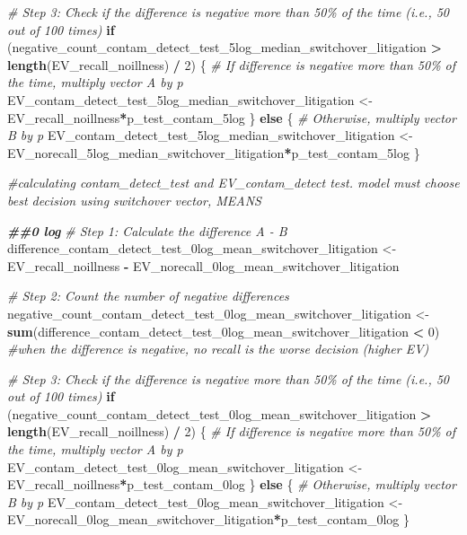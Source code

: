 \documentclass[
]{article}
\newenvironment{Shaded}{\begin{snugshade}}{\end{snugshade}}
\newcommand{\CommentTok}[1]{\textcolor[rgb]{0.56,0.35,0.01}{\textit{#1}}}
\newcommand{\ControlFlowTok}[1]{\textcolor[rgb]{0.13,0.29,0.53}{\textbf{#1}}}
\newcommand{\DecValTok}[1]{\textcolor[rgb]{0.00,0.00,0.81}{#1}}
\newcommand{\DocumentationTok}[1]{\textcolor[rgb]{0.56,0.35,0.01}{\textbf{\textit{#1}}}}
\newcommand{\FunctionTok}[1]{\textcolor[rgb]{0.13,0.29,0.53}{\textbf{#1}}}
\newcommand{\NormalTok}[1]{#1}
\newcommand{\OtherTok}[1]{\textcolor[rgb]{0.56,0.35,0.01}{#1}}
\newcommand{\SpecialCharTok}[1]{\textcolor[rgb]{0.81,0.36,0.00}{\textbf{#1}}}
\begin{document}
\begin{Shaded}
\begin{Highlighting}[]
\CommentTok{\# Step 3: Check if the difference is negative more than 50\% of the time (i.e., 50 out of 100 times)}
\ControlFlowTok{if}\NormalTok{ (negative\_count\_contam\_detect\_test\_5log\_median\_switchover\_litigation }\SpecialCharTok{\textgreater{}} \FunctionTok{length}\NormalTok{(EV\_recall\_noillness) }\SpecialCharTok{/} \DecValTok{2}\NormalTok{) \{}
  \CommentTok{\# If difference is negative more than 50\% of the time, multiply vector A by p}
\NormalTok{  EV\_contam\_detect\_test\_5log\_median\_switchover\_litigation }\OtherTok{\textless{}{-}}\NormalTok{ EV\_recall\_noillness}\SpecialCharTok{*}\NormalTok{p\_test\_contam\_5log}
\NormalTok{\} }\ControlFlowTok{else}\NormalTok{ \{}
  \CommentTok{\# Otherwise, multiply vector B by p}
\NormalTok{ EV\_contam\_detect\_test\_5log\_median\_switchover\_litigation  }\OtherTok{\textless{}{-}}\NormalTok{ EV\_norecall\_5log\_median\_switchover\_litigation}\SpecialCharTok{*}\NormalTok{p\_test\_contam\_5log}
\NormalTok{\}}


\CommentTok{\#calculating contam\_detect\_test and EV\_contam\_detect test. model must choose best decision using switchover vector, MEANS}

\DocumentationTok{\#\#0 log}
\CommentTok{\# Step 1: Calculate the difference A {-} B}
\NormalTok{difference\_contam\_detect\_test\_0log\_mean\_switchover\_litigation }\OtherTok{\textless{}{-}}\NormalTok{ EV\_recall\_noillness }\SpecialCharTok{{-}}\NormalTok{ EV\_norecall\_0log\_mean\_switchover\_litigation}

\CommentTok{\# Step 2: Count the number of negative differences}
\NormalTok{negative\_count\_contam\_detect\_test\_0log\_mean\_switchover\_litigation }\OtherTok{\textless{}{-}} \FunctionTok{sum}\NormalTok{(difference\_contam\_detect\_test\_0log\_mean\_switchover\_litigation }\SpecialCharTok{\textless{}} \DecValTok{0}\NormalTok{) }\CommentTok{\#when the difference is negative, no recall is the worse decision (higher EV)}

\CommentTok{\# Step 3: Check if the difference is negative more than 50\% of the time (i.e., 50 out of 100 times)}
\ControlFlowTok{if}\NormalTok{ (negative\_count\_contam\_detect\_test\_0log\_mean\_switchover\_litigation }\SpecialCharTok{\textgreater{}} \FunctionTok{length}\NormalTok{(EV\_recall\_noillness) }\SpecialCharTok{/} \DecValTok{2}\NormalTok{) \{}
  \CommentTok{\# If difference is negative more than 50\% of the time, multiply vector A by p}
\NormalTok{  EV\_contam\_detect\_test\_0log\_mean\_switchover\_litigation }\OtherTok{\textless{}{-}}\NormalTok{ EV\_recall\_noillness}\SpecialCharTok{*}\NormalTok{p\_test\_contam\_0log}
\NormalTok{\} }\ControlFlowTok{else}\NormalTok{ \{}
  \CommentTok{\# Otherwise, multiply vector B by p}
\NormalTok{ EV\_contam\_detect\_test\_0log\_mean\_switchover\_litigation }\OtherTok{\textless{}{-}}\NormalTok{ EV\_norecall\_0log\_mean\_switchover\_litigation}\SpecialCharTok{*}\NormalTok{p\_test\_contam\_0log}
\NormalTok{\}}



\end{Highlighting}
\end{Shaded}
\end{document}
